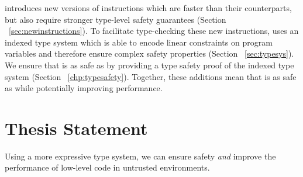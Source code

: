 \name introduces new versions of \wasm instructions which are faster than their \wasm counterparts, but also require stronger type-level safety guarantees (Section ~\ref{sec:newinstructions}).
To facilitate type-checking these new instructions, \name uses an indexed type system which is able to encode linear constraints on program variables and therefore ensure complex safety properties (Section ~\ref{sec:typesys}).
We ensure that \name is as safe as \wasm by providing a type safety proof of the \name indexed type system (Section ~\ref{chp:typesafety}).
Together, these additions mean that \name is as safe as \wasm while potentially improving performance.

\section{Thesis Statement}
\begin{adjustwidth}{1cm}{1cm}
    Using a more expressive type system, we can ensure safety \emph{and} improve the performance of low-level code in untrusted environments.
\end{adjustwidth}



